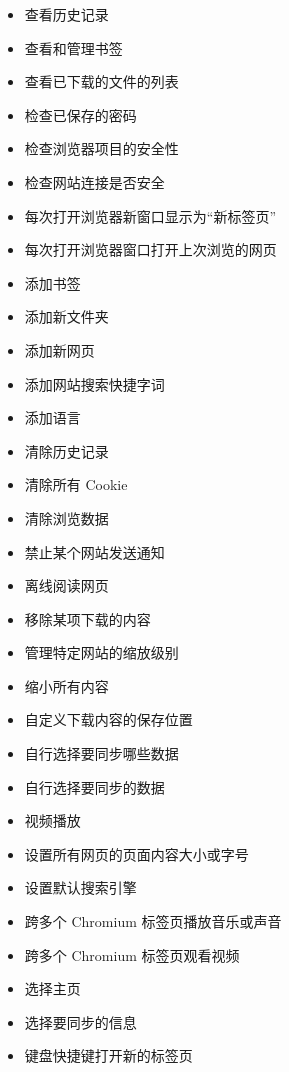 \documentclass{article}
\begin{document}
\begin{itemize}
    \item 查看历史记录
    \item 查看和管理书签
    \item 查看已下载的文件的列表
    \item 检查已保存的密码
    \item 检查浏览器项目的安全性
    \item 检查网站连接是否安全
    \item 每次打开浏览器新窗口显示为“新标签页”
    \item 每次打开浏览器窗口打开上次浏览的网页
    \item 添加书签
    \item 添加新文件夹
    \item 添加新网页
    \item 添加网站搜索快捷字词
    \item 添加语言
    \item 清除历史记录
    \item 清除所有 Cookie
    \item 清除浏览数据
    \item 禁止某个网站发送通知
    \item 离线阅读网页
    \item 移除某项下载的内容
    \item 管理特定网站的缩放级别
    \item 缩小所有内容
    \item 自定义下载内容的保存位置
    \item 自行选择要同步哪些数据
    \item 自行选择要同步的数据
    \item 视频播放
    \item 设置所有网页的页面内容大小或字号
    \item 设置默认搜索引擎
    \item 跨多个 Chromium 标签页播放音乐或声音
    \item 跨多个 Chromium 标签页观看视频
    \item 选择主页
    \item 选择要同步的信息
    \item 键盘快捷键打开新的标签页
\end{itemize}

\end{document}
